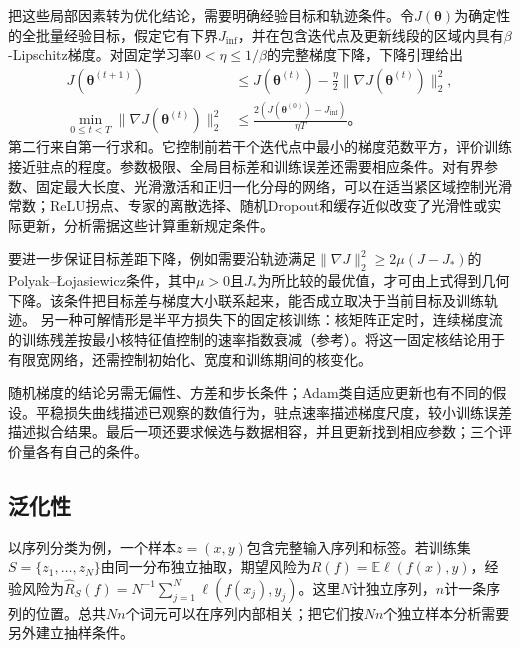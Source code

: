 把这些局部因素转为优化结论，需要明确经验目标和轨迹条件。令$J(\bm\theta)$为确定性的全批量经验目标，假定它有下界$J_{\inf}$，并在包含迭代点及更新线段的区域内具有$\beta$-Lipschitz梯度。对固定学习率$0<\eta\leq1/\beta$的完整梯度下降，下降引理给出
\begin{equation}
  \begin{aligned}
    J(\bm\theta^{(t+1)})
      &\leq J(\bm\theta^{(t)})-\frac\eta2
                   \lVert\nabla J(\bm\theta^{(t)})\rVert_2^2,\\
    \min_{0\leq t<T}\lVert\nabla J(\bm\theta^{(t)})\rVert_2^2
      &\leq\frac{2(J(\bm\theta^{(0)})-J_{\inf})}{\eta T}\text{。}
  \end{aligned}
  \label{eq:transformer-stationary-convergence}
\end{equation}
第二行来自第一行求和。它控制前若干个迭代点中最小的梯度范数平方，评价训练接近驻点的程度。参数极限、全局目标差和训练误差还需要相应条件。对有界参数、固定最大长度、光滑激活和正归一化分母的网络，可以在适当紧区域控制光滑常数；ReLU拐点、专家的离散选择、随机Dropout和缓存近似改变了光滑性或实际更新，分析需据这些计算重新规定条件。

要进一步保证目标差距下降，例如需要沿轨迹满足$\lVert\nabla J\rVert_2^2\geq2\mu(J-J_*)$的Polyak--Łojasiewicz条件，其中$\mu>0$且$J_*$为所比较的最优值，才可由上式得到几何下降。该条件把目标差与梯度大小联系起来，能否成立取决于当前目标及训练轨迹。
另一种可解情形是半平方损失下的固定核训练：核矩阵正定时，连续梯度流的训练残差按最小核特征值控制的速率指数衰减（参考）。将这一固定核结论用于有限宽网络，还需控制初始化、宽度和训练期间的核变化。

随机梯度的结论另需无偏性、方差和步长条件；Adam类自适应更新也有不同的假设。平稳损失曲线描述已观察的数值行为，驻点速率描述梯度尺度，较小训练误差描述拟合结果。最后一项还要求候选与数据相容，并且更新找到相应参数；三个评价量各有自己的条件。

\subsection{泛化性}
\label{sec:transformer-model-generalization}

以序列分类为例，一个样本$z=(x,y)$包含完整输入序列和标签。若训练集$S=\{z_1,\ldots,z_N\}$由同一分布独立抽取，期望风险为$R(f)=\mathbb E\ell(f(x),y)$，经验风险为$\widehat R_S(f)=N^{-1}\sum_{j=1}^N\ell(f(x_j),y_j)$。这里$N$计独立序列，$n$计一条序列的位置。总共$Nn$个词元可以在序列内部相关；把它们按$Nn$个独立样本分析需要另外建立抽样条件。

